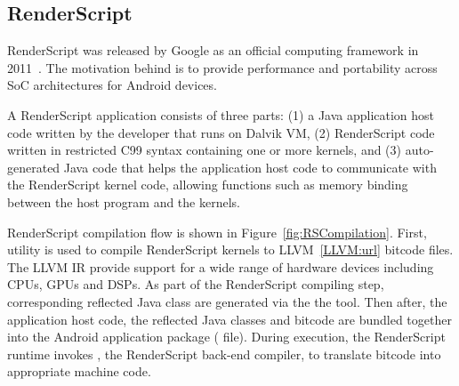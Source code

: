 
\subsection{RenderScript}
RenderScript was released by Google as an official computing framework in
2011~\cite{Renderscript}. The motivation behind is to provide
performance and portability across SoC architectures for Android devices.

A RenderScript application consists of three parts: (1) a Java application host
code written by the developer that runs on Dalvik VM, (2) RenderScript code
written in restricted C99 syntax containing one or more kernels, and (3)
auto-generated Java code that helps the application host code to communicate with
the RenderScript kernel code, allowing functions such as memory binding between the
host program and the kernels.


RenderScript compilation flow is shown in Figure~\ref{fig:RSCompilation}.
First,  utility is used to compile RenderScript kernels to
LLVM~\ref{LLVM:url} bitcode files. The LLVM IR provide support for a wide range of hardware
devices including CPUs, GPUs and DSPs. 
As part of the RenderScript compiling step, corresponding reflected Java class
are generated via the  the  tool.
Then after, the application host code, the reflected Java classes and bitcode
are bundled together into the Android application package ( file).
During execution, the RenderScript
runtime invokes , the RenderScript back-end compiler, to translate
bitcode into appropriate machine code.


